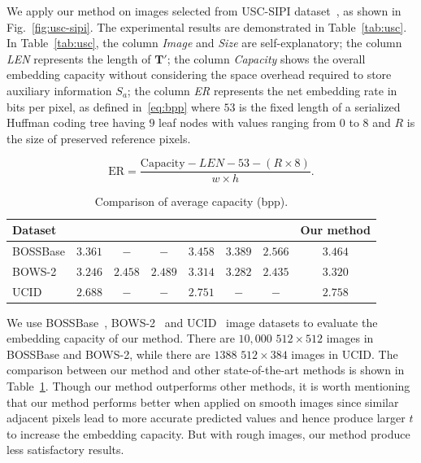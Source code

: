 \documentclass{elsarticle}
\begin{document}
	We apply our method on images selected from USC-SIPI dataset~\cite{UniversityofSouthernCalifornia2020}, as shown in Fig.~\ref{fig:usc-sipi}.
	The experimental results are demonstrated in Table~\ref{tab:usc}. 
	In Table~\ref{tab:usc}, 
	the column \emph{Image} and \emph{Size} are self-explanatory; 
	the column \emph{LEN} represents the length of \(\mathbf{T'}\);
	the column \emph{Capacity} shows the overall embedding capacity without considering the space overhead required to store auxiliary information \(S_a\);
	the column \emph{ER} represents the net embedding rate in bits per pixel, as defined in~\eqref{eq:bpp} where \(53\) is the fixed length of a serialized Huffman coding tree having \(9\) leaf nodes with values ranging from \(0\) to \(8\) and \(R\) is the size of preserved reference pixels.
	
	\begin{equation}
		\mathrm{ER} = \frac{\mathrm{Capacity} - LEN - 53 - (R \times 8)}{w \times h}.
		\label{eq:bpp}
	\end{equation}
	
	
	
	\setlength{\tabcolsep}{4pt}
	\begin{table}[!t]
		\centering
		\caption{Comparison of average capacity (bpp).}
		\label{tab:compare}
		\begin{tabular}{lccccccc}
			\toprule
			Dataset  & \cite{Yin2020} & \cite{Puteaux2021} & \cite{Zhang2022} & \cite{Gao2023} & \cite{Sui2023} & \cite{Pang2023} & Our method \\
			\midrule
			BOSSBase & \(3.361\) & \(-\)     & \(-\)     & \(3.458\) & \(3.389\) & \(2.566\) & \(3.464\)  \\
			BOWS-2 	 & \(3.246\) & \(2.458\) & \(2.489\) & \(3.314\) & \(3.282\) & \(2.435\) & \(3.320\)  \\
			UCID 	 & \(2.688\) & \(-\)     & \(-\)     & \(2.751\) & \(-\)     & \(-\)     & \(2.758\)  \\
			\bottomrule
		\end{tabular}
	\end{table}
	
	We use BOSSBase~\cite{Bas2011}, BOWS-2~\cite{Filler2010} and UCID~\cite{Schaefer2003} image datasets to evaluate the embedding capacity of our method. 
	There are \(10,000\) \(512 \times 512\) images in BOSSBase and BOWS-2, while there are \(1388\) \(512 \times 384\) images in UCID.
	The comparison between our method and other state-of-the-art methods is shown in Table~\ref{tab:compare}.
	Though our method outperforms other methods, it is worth mentioning that our method performs better when applied on smooth images since similar adjacent pixels lead to more accurate predicted values and hence produce larger \(t\) to increase the embedding capacity. 
	But with rough images, our method produce less satisfactory results.
	
\end{document}
